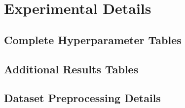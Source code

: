 \documentclass[11pt,a4paper,english,oneside]{book}
\begin{document}
\newpage
{}










\appendix
\begingroup
\makeatletter
\let\ps@plain\ps@empty
\appendixpage
\makeatother
\endgroup
\noappendicestocpagenum
\addappheadtotoc

\renewcommand{\theequation}{A.\arabic{equation}}

\chapter{Experimental Details\label{chp:experimental_details}}

\section{Complete Hyperparameter Tables}

\section{Additional Results Tables}

\section{Dataset Preprocessing Details}

\printbibliography

\newpage

\thispagestyle{firststyle}
\end{document}
